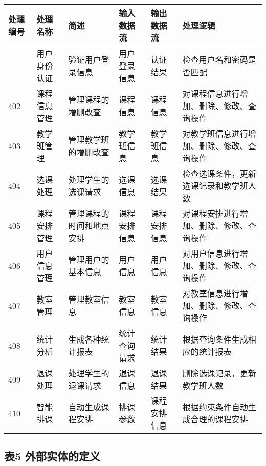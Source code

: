 \documentclass[
]{article}
\begin{document}
\begin{longtable}[]{@{}llllll@{}}
\toprule\noalign{}
处理编号 & 处理名称 & 简述 & 输入数据流 & 输出数据流 & 处理逻辑 \\
\midrule\noalign{}
\endhead
\bottomrule\noalign{}
\endlastfoot
401 & 用户身份认证 & 验证用户登录信息 & 用户登录信息 & 认证结果 &
检查用户名和密码是否匹配 \\
402 & 课程信息管理 & 管理课程的增删改查 & 课程信息 & 课程信息 &
对课程信息进行增加、删除、修改、查询操作 \\
403 & 教学班管理 & 管理教学班的增删改查 & 教学班信息 & 教学班信息 &
对教学班信息进行增加、删除、修改、查询操作 \\
404 & 选课处理 & 处理学生的选课请求 & 选课信息 & 选课结果 &
检查选课条件，更新选课记录和教学班人数 \\
405 & 课程安排管理 & 管理课程的时间和地点安排 & 课程安排信息 &
课程安排信息 & 对课程安排进行增加、删除、修改、查询操作 \\
406 & 用户信息管理 & 管理用户的基本信息 & 用户信息 & 用户信息 &
对用户信息进行增加、删除、修改、查询操作 \\
407 & 教室管理 & 管理教室信息 & 教室信息 & 教室信息 &
对教室信息进行增加、删除、修改、查询操作 \\
408 & 统计分析 & 生成各种统计报表 & 统计查询请求 & 统计结果 &
根据查询条件生成相应的统计报表 \\
409 & 退课处理 & 处理学生的退课请求 & 退课信息 & 退课结果 &
删除选课记录，更新教学班人数 \\
410 & 智能排课 & 自动生成课程安排 & 排课参数 & 课程安排信息 &
根据约束条件自动生成合理的课程安排 \\
\end{longtable}

\subsection{表5
外部实体的定义}\label{ux88685-ux5916ux90e8ux5b9eux4f53ux7684ux5b9aux4e49}
\end{document}
